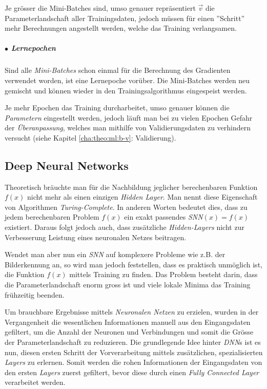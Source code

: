 Je grösser die Mini-Batches sind, umso genauer repräsentiert $\vec{v}$ die Parameterlandschaft aller Trainingsdaten, jedoch müssen für einen ''Schritt'' mehr Berechnungen angestellt werden, welche das Training verlangsamen.


\subparagraph{$\bullet$ Lernepochen} Sind alle \textit{Mini-Batches} schon einmal für die Berechnung des Gradienten verwendet worden, ist eine Lernepoche vorüber. Die Mini-Batches werden neu gemischt und können wieder in den Trainingsalgorithmus eingespeist werden.

Je mehr Epochen das Training durcharbeitet, umso genauer können die \textit{Parametern} eingestellt werden, jedoch läuft man bei zu vielen Epochen Gefahr der \textit{Überanpassung}, welches man mithilfe von Validierungsdaten zu verhindern versucht (siehe Kapitel \ref{cha:theo:ml:b-v}: Validierung).


\subsection[DNNs]{Deep Neural Networks}\label{cha:theo:dl}
Theoretisch bräuchte man für die Nachbildung jeglicher berechenbaren Funktion $f(x)$ nicht mehr als einen einzigen \textit{Hidden Layer}. Man nennt diese Eigenschaft von Algorithmen \textit{Turing-Complete}. In anderen Worten bedeutet dies, dass zu jedem berechenbaren Problem $f(x)$ ein exakt passendes \textit{SNN}$(x) = f(x)$ existiert\cite{siegelmann}. Daraus folgt jedoch auch, dass zusätzliche \textit{Hidden-Layers} nicht zur Verbesserung Leistung eines neuronalen Netzes beitragen\footnotemark.\\


Wendet man aber nun ein \textit{SNN} auf komplexere Probleme wie z.B. der Bilderkennung an, so wird man jedoch feststellen, dass es praktisch unmöglich ist, die Funktion $f(x)$ mittels Training zu finden. Das Problem besteht darin, dass die Parameterlandschaft enorm gross ist und viele lokale Minima das Training frühzeitig beenden.

Um brauchbare Ergebnisse mittels \textit{Neuronalen Netzen} zu erzielen, wurden in der Vergangenheit die wesentlichen Informationen manuell aus den Eingangsdaten gefiltert, um die Anzahl der Neuronen und Verbindungen und somit die Grösse der Parameterlandschaft zu reduzieren. Die grundlegende Idee hinter \textit{DNN}s ist es nun, diesen ersten Schritt der Vorverarbeitung mittels zusätzlichen, spezialisierten \textit{Layers} zu erlernen. Somit werden die rohen Informationen der Eingangsdaten von den ersten \textit{Layers} zuerst gefiltert, bevor diese durch einen \textit{Fully Connected Layer} verarbeitet werden.\\


